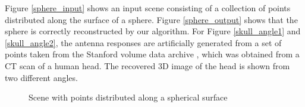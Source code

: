 \documentclass[twocolumn]{article}
\begin{document}
Figure \ref{sphere_input} shows an input scene consisting of a collection of points distributed along the surface of a sphere. Figure \ref{sphere_output} shows that the sphere is correctly reconstructed by our algorithm. For Figure \ref{skull_angle1} and \ref{skull_angle2}, the antenna responses are artificially generated from a set of points taken from the Stanford volume data archive \cite{levoy1988display}, which was obtained from a CT scan of a human head. The recovered 3D image of the head is shown from two different angles.

\begin{figure}
\begin{centering}

	
\end{centering}
\caption{Scene with points distributed along a spherical surface}
\end{figure}
\end{document}
